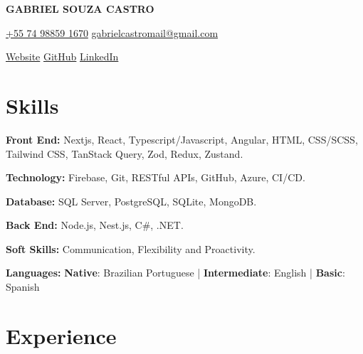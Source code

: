 \documentclass[a4paper,10pt]{article}
\begin{document}

\noindent
\begin{minipage}[t]{0.5\textwidth}
\textbf{\Large GABRIEL SOUZA CASTRO}

\vspace{0.4em}

\end{minipage}%
\begin{minipage}[t]{0.5\textwidth}
\raggedleft
{\color{blue}} \href{https://example.com}{\faPhone \space +55 74 98859 1670} \quad
{\color{blue}} \href{mailto:gabrielcastromail@gmail.com}{\faEnvelope \space gabrielcastromail@gmail.com}

\vspace{0.2em}

{\color{blue}} \href{https://gabrcastro.vercel.app}{\faGlobe \space Website} \quad
{\color{blue}} \href{https://github.com/gabrcastro}{\faGithub \space GitHub} \quad
{\color{blue}} \href{https://linkedin.com/in/gabrielsouzacastro}{\faLinkedin \space LinkedIn} \\
\end{minipage}

\vspace{0.5em}

\section*{Skills}
\vspace{0.6em}
\item \textbf{Front End:} Nextjs, React, Typescript/Javascript, Angular, HTML, CSS/SCSS, Tailwind CSS, TanStack Query, Zod, Redux, Zustand.
\item \textbf{Technology:} Firebase, Git, RESTful APIs, GitHub, Azure, CI/CD.
\item \textbf{Database:} SQL Server, PostgreSQL, SQLite, MongoDB.
\item \textbf{Back End:} Node.js, Nest.js, C#, .NET.
\item \textbf{Soft Skills:} Communication, Flexibility and Proactivity.
\item \textbf{Languages:} \textbf{Native}: Brazilian Portuguese | \textbf{Intermediate}: English | \textbf{Basic}: Spanish

\vspace{1em}

\section*{Experience}
\vspace{0.6em}
\end{document}
